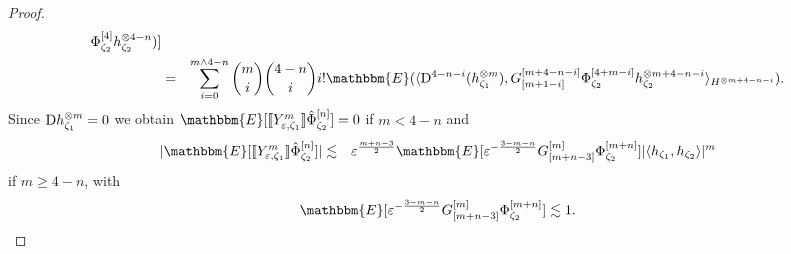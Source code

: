 \begin{proof}
\begin{eqnarray*}
    \Phi^{[4]}_{\zeta_2} h_{\zeta_2}^{\otimes 4 - n})]\\
    & = & \sum_{i = 0}^{m \wedge 4 - n} \binom{m}{i} \binom{4 - n}{i}
    i!\mathbbm{E} (\langle \mathD^{4 - n - i} (h_{\zeta_1}^{\otimes m}), G_{[m
    + 1 - i]}^{[m + 4 - n - i]} \Phi^{[4 + m - i]}_{\zeta_2}
    h_{\zeta_2}^{\otimes m + 4 - n - i} \rangle_{H^{\otimes m + 4 - n - i}}) .
  \end{eqnarray*}
  Since $\mathrm{D} h^{\otimes m}_{\zeta_1} = 0$ we obtain $\mathbbm{E}
  [\llbracket Y^m_{\varepsilon, \zeta_1} \rrbracket
  \hat{\Phi}^{[n]}_{\zeta_2}] = 0$ if $m < 4 - n$ and
  \begin{eqnarray*}
    | \mathbbm{E} [\llbracket Y^m_{\varepsilon, \zeta_1} \rrbracket
    \hat{\Phi}^{[n]}_{\zeta_2}] | & \lesssim & \varepsilon^{\frac{m + n -
    3}{2}} \mathbbm{E} [\varepsilon^{- \frac{3 - m - n}{2}} G_{[m + n -
    3]}^{[m]} \Phi^{[m + n]}_{\zeta_2}] | \langle h_{\zeta_1}, h_{\zeta_2}
    \rangle |^m
  \end{eqnarray*}
  if $m \geqslant 4 - n$, with
  \[ \mathbbm{E} [\varepsilon^{- \frac{3 - m - n}{2}} G_{[m + n - 3]}^{[m]}
     \Phi^{[m + n]}_{\zeta_2}] \lesssim 1. \]
\end{proof}

